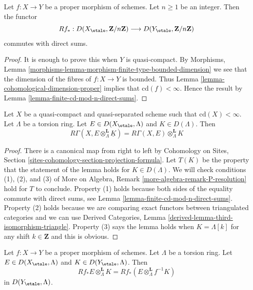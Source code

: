 \begin{lemma}
\label{lemma-proper-mod-n-direct-sums}
Let $f : X \to Y$ be a proper morphism of schemes. Let $n \geq 1$
be an integer. Then the functor
$$
Rf_* :
D(X_\etale, \mathbf{Z}/n\mathbf{Z})
\longrightarrow
D(Y_\etale, \mathbf{Z}/n\mathbf{Z})
$$
commutes with direct sums.
\end{lemma}

\begin{proof}
It is enough to prove this when $Y$ is quasi-compact. By
Morphisms, Lemma \ref{morphisms-lemma-morphism-finite-type-bounded-dimension}
we see that the dimension of the fibres of
$f : X \to Y$ is bounded.
Thus Lemma \ref{lemma-cohomological-dimension-proper}
implies that $\text{cd}(f) < \infty$. Hence the
result by Lemma \ref{lemma-finite-cd-mod-n-direct-sums}.
\end{proof}

\begin{lemma}
\label{lemma-pull-out-constant-mod-n}
Let $X$ be a quasi-compact and quasi-separated scheme
such that $\text{cd}(X) < \infty$. Let $\Lambda$ be a torsion ring.
Let $E \in D(X_\etale, \Lambda)$ and $K \in D(\Lambda)$. Then
$$
R\Gamma(X, E \otimes_\Lambda^\mathbf{L} \underline{K}) =
R\Gamma(X, E) \otimes_\Lambda^\mathbf{L} K
$$
\end{lemma}

\begin{proof}
There is a canonical map from right to left by
Cohomology on Sites, Section \ref{sites-cohomology-section-projection-formula}.
Let $T(K)$ be the property that the statement of the
lemma holds for $K \in D(\Lambda)$.
We will check conditions (1), (2), and (3) of
More on Algebra, Remark \ref{more-algebra-remark-P-resolution}
hold for $T$ to conclude.
Property (1) holds because both sides of the equality
commute with direct sums, see
Lemma \ref{lemma-finite-cd-mod-n-direct-sums}.
Property (2) holds because we are comparing exact functors
between triangulated categories and we can use
Derived Categories, Lemma \ref{derived-lemma-third-isomorphism-triangle}.
Property (3) says the lemma holds when $K = \Lambda[k]$
for any shift $k \in \mathbf{Z}$ and this is obvious.
\end{proof}

\begin{lemma}
\label{lemma-projection-formula-proper-mod-n}
Let $f : X \to Y$ be a proper morphism of schemes. Let $\Lambda$
be a torsion ring. Let $E \in D(X_\etale, \Lambda)$ and
$K \in D(Y_\etale, \Lambda)$. Then
$$
Rf_*E \otimes_\Lambda^\mathbf{L} K =
Rf_*(E \otimes_\Lambda^\mathbf{L} f^{-1}K)
$$
in $D(Y_\etale, \Lambda)$.
\end{lemma}

